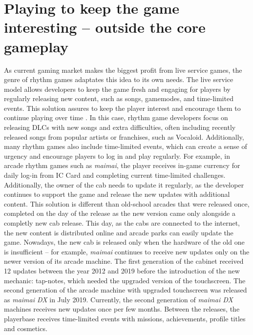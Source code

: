 \section{Playing to keep the game interesting -- outside the core gameplay}
As current gaming market makes the biggest profit from live service games, the genre of rhythm games adaptates this idea to its own needs. The live service model allows developers to keep the game fresh and engaging for players by regularly releasing new content, such as songs, gamemodes, and time-limited events. This solution assures to keep the player interest and encourage them to continue playing over time \cite{liveservice}. In this case, rhythm game developers focus on releasing DLCs with new songs and extra difficulties, often including recently released songs from popular artists or franchises, such as Vocaloid. Additionally, many rhythm games also include time-limited events, which can create a sense of urgency and encourage players to log in and play regularly. For example, in arcade rhythm games such as \textit{maimai}, the player receives in-game currency for daily log-in from IC Card and completing current time-limited challenges. Additionally, the owner of the cab needs to update it regularly, as the developer continues to support the game and release the new updates with additional content. This solution is different than old-school arcades that were released once, completed on the day of the release as the new version came only alongside a completly new cab release. This day, as the cabs are connected to the internet, the new content is distributed online and arcade parks can easily update the game. Nowadays, the new cab is released only when the hardware of the old one is insufficient -- for example, \textit{maimai} continues to receive new updates only on the newer version of its arcade machine. The first generation of the cabinet received 12 updates between the year 2012 and 2019 before the introduction of the new mechanic: tap-notes, which needed the upgraded version of the touchscreen. The second generation of the arcade machine with upgraded touchscreen was released as \textit{maimai DX} in July 2019. Currently, the second generation of \textit{maimai DX} machines receives new updates once per few months. Between the releases, the playerbase receives time-limited events with missions, achievements, profile titles and cosmetics.

